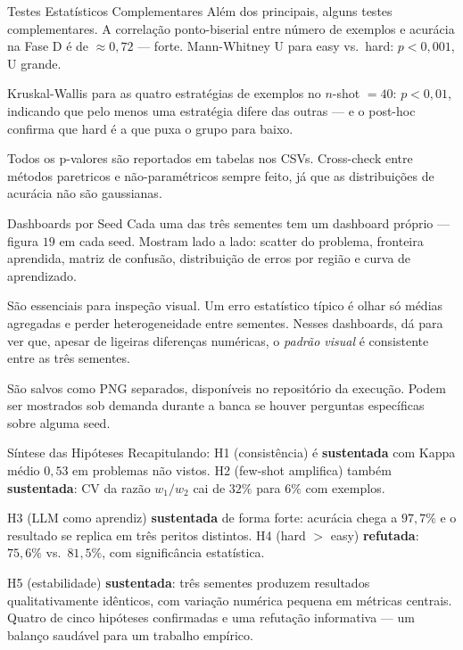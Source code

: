 \documentclass[aspectratio=169,10pt]{beamer}
\begin{document}
\begin{frame}{Testes Estat\'isticos Complementares}
  \small
  Al\'em dos principais, alguns testes complementares. A correla\c{c}\~ao ponto-biserial entre n\'umero
  de exemplos e acur\'acia na Fase D \'e de $\approx 0{,}72$ --- forte. Mann-Whitney U para easy vs.\
  hard: $p < 0{,}001$, U grande.
  \medskip

  Kruskal-Wallis para as quatro estrat\'egias de exemplos no $n$-shot $= 40$: $p < 0{,}01$, indicando
  que pelo menos uma estrat\'egia difere das outras --- e o post-hoc confirma que hard \'e a que puxa o
  grupo para baixo.
  \medskip

  Todos os p-valores s\~ao reportados em tabelas nos CSVs. Cross-check entre m\'etodos paretricos e
  n\~ao-param\'etricos sempre feito, j\'a que as distribui\c{c}\~oes de acur\'acia n\~ao s\~ao gaussianas.
\end{frame}

\begin{frame}{Dashboards por Seed}
  \small
  Cada uma das tr\^es sementes tem um dashboard pr\'oprio --- figura $19$ em cada seed. Mostram lado a
  lado: scatter do problema, fronteira aprendida, matriz de confus\~ao, distribui\c{c}\~ao de erros por
  regi\~ao e curva de aprendizado.
  \medskip

  S\~ao essenciais para inspe\c{c}\~ao visual. Um erro estat\'istico t\'ipico \'e olhar s\'o m\'edias
  agregadas e perder heterogeneidade entre sementes. Nesses dashboards, d\'a para ver que, apesar de
  ligeiras diferen\c{c}as num\'ericas, o \emph{padr\~ao visual} \'e consistente entre as tr\^es sementes.
  \medskip

  S\~ao salvos como PNG separados, dispon\'iveis no reposit\'orio da execu\c{c}\~ao. Podem ser mostrados
  sob demanda durante a banca se houver perguntas espec\'ificas sobre alguma seed.
\end{frame}

\begin{frame}{S\'intese das Hip\'oteses}
  \small
  Recapitulando: H1 (consist\^encia) \'e \textbf{sustentada} com Kappa m\'edio $0{,}53$ em problemas
  n\~ao vistos. H2 (few-shot amplifica) tamb\'em \textbf{sustentada}: CV da raz\~ao $w_1/w_2$ cai de
  $32\%$ para $6\%$ com exemplos.
  \medskip

  H3 (LLM como aprendiz) \textbf{sustentada} de forma forte: acur\'acia chega a $97{,}7\%$ e o resultado
  se replica em tr\^es peritos distintos. H4 (hard $>$ easy) \textbf{refutada}: $75{,}6\%$ vs.\ $81{,}5\%$,
  com signific\^ancia estat\'istica.
  \medskip

  H5 (estabilidade) \textbf{sustentada}: tr\^es sementes produzem resultados qualitativamente id\^enticos,
  com varia\c{c}\~ao num\'erica pequena em m\'etricas centrais. Quatro de cinco hip\'oteses confirmadas
  e uma refuta\c{c}\~ao informativa --- um balan\c{c}o saud\'avel para um trabalho emp\'irico.
\end{frame}
\end{document}
